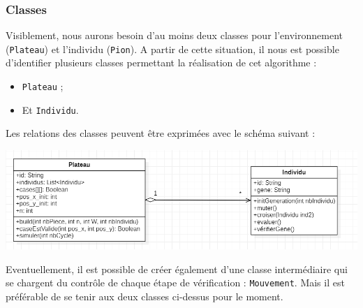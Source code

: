 \hypertarget{classes}{%
\subsubsection{Classes}\label{classes}}

Visiblement, nous aurons besoin d'au moins deux classes pour
l'environnement (\texttt{Plateau}) et l'individu (\texttt{Pion}). A
partir de cette situation, il nous est possible d'identifier plusieurs
classes permettant la réalisation de cet algorithme :

\begin{itemize}
\tightlist
\item
  \texttt{Plateau} ;
\item
  Et \texttt{Individu}.
\end{itemize}

Les relations des classes peuvent être exprimées avec le schéma suivant
:

\includegraphics{.ressources/uml_classes_plateau_1.png}

Eventuellement, il est possible de créer également d'une classe
intermédiaire qui se chargent du contrôle de chaque étape de
vérification : \texttt{Mouvement}. Mais il est préférable de se tenir
aux deux classes ci-dessus pour le moment.
